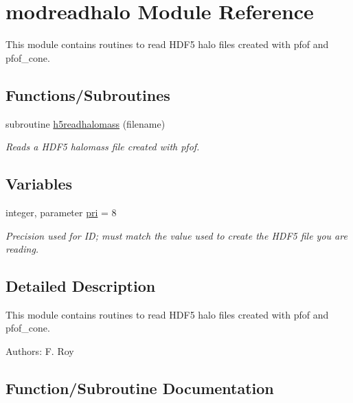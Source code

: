 \hypertarget{namespacemodreadhalo}{}\section{modreadhalo Module Reference}
\label{namespacemodreadhalo}


This module contains routines to read H\+D\+F5 halo files created with pfof and pfof\+\_\+cone.  


\subsection*{Functions/\+Subroutines}
\begin{DoxyCompactItemize}
\item 
subroutine \hyperlink{namespacemodreadhalo_a5e581ff805da170ad66cbd51e3b4967e}{h5readhalomass} (filename)
\begin{DoxyCompactList}\small\item\em Reads a H\+D\+F5 halomass file created with pfof. \end{DoxyCompactList}\end{DoxyCompactItemize}
\subsection*{Variables}
\begin{DoxyCompactItemize}
\item 
integer, parameter \hyperlink{namespacemodreadhalo_ad55bcc6ce90e0b688319fd72bf579b36}{pri} = 8
\begin{DoxyCompactList}\small\item\em Precision used for ID; must match the value used to create the H\+D\+F5 file you are reading. \end{DoxyCompactList}\end{DoxyCompactItemize}


\subsection{Detailed Description}
This module contains routines to read H\+D\+F5 halo files created with pfof and pfof\+\_\+cone. 

Authors\+: F. Roy 

\subsection{Function/\+Subroutine Documentation}
